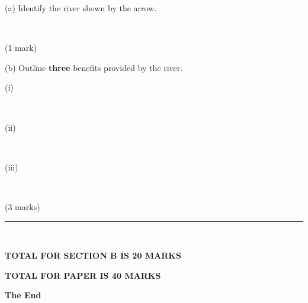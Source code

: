 \documentclass{article}
\begin{document}
\begin{enumerate}
(a) Identify the river shown by the arrow. \\ \vspace{10pt}

\dotuline{\hspace{16cm}} \\
\vspace{7pt}

\hfill\raggedright (1 mark) 
\vspace{5pt}
\hline
\vspace{3pt}

\newpage

(b) Outline \textbf{three} benefits provided by the river. \\
\vspace{15pt}

(i) \dotuline{\hspace{16.5cm}} \\
 \vspace{15pt}

\quad \dotuline{\hspace{16.5cm}} \\
\vspace{15pt}

(ii) \dotuline{\hspace{16.5cm}} \\
\vspace{15pt}

\quad \dotuline{\hspace{16.5cm}} \\
\vspace{15pt}

(iii) \dotuline{\hspace{16.5cm}} \\
\vspace{15pt}

\quad \dotuline{\hspace{16.5cm}} \\
\vspace{15pt}

\hfill\raggedright (3 marks) 
\vspace{5pt}
\hline
\vspace{7pt}

\vspace{5pt}
\rule{\linewidth}{2pt} \\ 
\hfill\raggedright \textbf{TOTAL FOR SECTION B IS 20 MARKS}  \\
\hfill\raggedright \textbf{TOTAL FOR PAPER IS 40 MARKS} \\
\vspace{90pt}

\hspace{8cm} \textbf{The End}


\end{enumerate}
\end{document}
